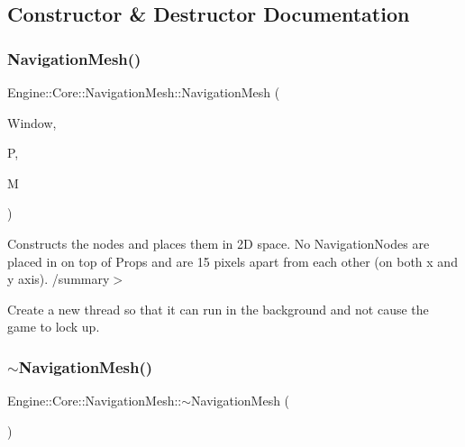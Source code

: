 \subsection{Constructor \& Destructor Documentation}
\mbox{\label{class_engine_1_1_core_1_1_navigation_mesh_a7c1d1dfb88aeb8d53a9d99bca5e67a66}} 
\subsubsection{\texorpdfstring{Navigation\+Mesh()}{NavigationMesh()}}
{\footnotesize\ttfamily Engine\+::\+Core\+::\+Navigation\+Mesh\+::\+Navigation\+Mesh (\begin{DoxyParamCaption}\item[{shared\+\_\+ptr$<$ Render\+Window $>$}]{Window,  }\item[{\hyperlink{class_engine_1_1_game_play_1_1_player}{Player}}]{P,  }\item[{\hyperlink{class_engine_1_1_core_1_1_map}{Map}}]{M }\end{DoxyParamCaption})}



Constructs the nodes and places them in 2D space. No Navigation\+Nodes are placed in on top of Props and are 15 pixels apart from each other (on both x and y axis). /summary$>$ 

Create a new thread so that it can run in the background and not cause the game to lock up. \mbox{\label{class_engine_1_1_core_1_1_navigation_mesh_af050cbb93dae59dd8262d5aa5615407c}} 
\subsubsection{\texorpdfstring{$\sim$\+Navigation\+Mesh()}{~NavigationMesh()}}
{\footnotesize\ttfamily Engine\+::\+Core\+::\+Navigation\+Mesh\+::$\sim$\+Navigation\+Mesh (\begin{DoxyParamCaption}{ }\end{DoxyParamCaption})}

